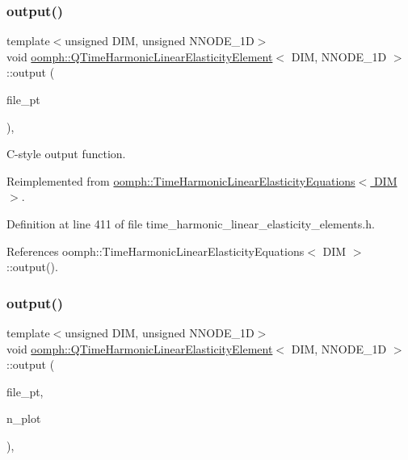 \subsubsection{\texorpdfstring{output()}{output()}\hspace{0.1cm}{\footnotesize\ttfamily [3/4]}}
{\footnotesize\ttfamily template$<$unsigned D\+IM, unsigned N\+N\+O\+D\+E\+\_\+1D$>$ \\
void \hyperlink{classoomph_1_1QTimeHarmonicLinearElasticityElement}{oomph\+::\+Q\+Time\+Harmonic\+Linear\+Elasticity\+Element}$<$ D\+IM, N\+N\+O\+D\+E\+\_\+1D $>$\+::output (\begin{DoxyParamCaption}\item[{F\+I\+LE $\ast$}]{file\+\_\+pt }\end{DoxyParamCaption})\hspace{0.3cm}{\ttfamily [inline]}, {\ttfamily [virtual]}}



C-\/style output function. 



Reimplemented from \hyperlink{classoomph_1_1TimeHarmonicLinearElasticityEquations_ab92581333fed6fcfd5267e3136c445c3}{oomph\+::\+Time\+Harmonic\+Linear\+Elasticity\+Equations$<$ D\+I\+M $>$}.



Definition at line 411 of file time\+\_\+harmonic\+\_\+linear\+\_\+elasticity\+\_\+elements.\+h.



References oomph\+::\+Time\+Harmonic\+Linear\+Elasticity\+Equations$<$ D\+I\+M $>$\+::output().

\mbox{\label{classoomph_1_1QTimeHarmonicLinearElasticityElement_a4d1ae51e639b76e695e2fc5a84b385ef}} 
\subsubsection{\texorpdfstring{output()}{output()}\hspace{0.1cm}{\footnotesize\ttfamily [4/4]}}
{\footnotesize\ttfamily template$<$unsigned D\+IM, unsigned N\+N\+O\+D\+E\+\_\+1D$>$ \\
void \hyperlink{classoomph_1_1QTimeHarmonicLinearElasticityElement}{oomph\+::\+Q\+Time\+Harmonic\+Linear\+Elasticity\+Element}$<$ D\+IM, N\+N\+O\+D\+E\+\_\+1D $>$\+::output (\begin{DoxyParamCaption}\item[{F\+I\+LE $\ast$}]{file\+\_\+pt,  }\item[{const unsigned \&}]{n\+\_\+plot }\end{DoxyParamCaption})\hspace{0.3cm}{\ttfamily [inline]}, {\ttfamily [virtual]}}



